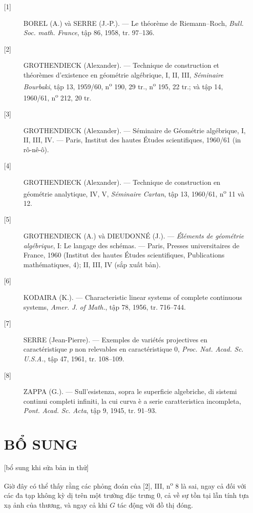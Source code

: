 \begin{description}
\item[{[1]}] BOREL (A.) và SERRE (J.-P.). --- Le théorème de Riemann--Roch,
\emph{Bull. Soc. math. France}, tập 86, 1958, tr. 97--136.

\item[{[2]}] GROTHENDIECK (Alexander). --- Technique de construction et
théorèmes d'existence en géométrie algébrique, I, II, III, \emph{Séminaire
Bourbaki}, tập 13, 1959/60, n\textsuperscript{o} 190, 29 tr.,
n\textsuperscript{o} 195, 22 tr.; và tập 14, 1960/61,
n\textsuperscript{o} 212, 20 tr.

\item[{[3]}] GROTHENDIECK (Alexander). --- Séminaire de Géométrie algébrique,
I, II, III, IV. --- Paris, Institut des hautes Études scientifiques, 1960/61
(in rô-nê-ô).

\item[{[4]}] GROTHENDIECK (Alexander). --- Technique de construction en
géométrie analytique, IV, V, \emph{Séminaire Cartan}, tập 13, 1960/61,
n\textsuperscript{o} 11 và 12.

\item[{[5]}] GROTHENDIECK (A.) và DIEUDONNÉ (J.). --- \emph{Éléments de
géométrie algébrique}, I: Le langage des schémas. --- Paris, Presses
universitaires de France, 1960 (Institut des hautes Études scientifiques,
Publications mathématiques, 4); II, III, IV (sắp xuất bản).

\item[{[6]}] KODAIRA (K.). --- Characteristic linear systems of complete
continuous systems, \emph{Amer. J. of Math.}, tập 78, 1956, tr. 716--744.

\item[{[7]}] SERRE (Jean-Pierre). --- Exemples de variétés projectives en
caractéristique $p$ non relevables en caractéristique 0, \emph{Proc. Nat. Acad.
Sc. U.S.A.}, tập 47, 1961, tr. 108--109.

\item[{[8]}] ZAPPA (G.). --- Sull'esistenza, sopra le superficie algebriche, di
sistemi continui completi infiniti, la cui curva è a serie caratteristica
incompleta, \emph{Pont. Acad. Sc. Acta}, tập 9, 1945, tr. 91--93.
\end{description}

\section*{BỔ SUNG}
\begin{center}
{\small [bổ sung khi sửa bản in thử]}
\end{center}

Giờ đây có thể thấy rằng các phỏng đoán của [2], III,
n\textsuperscript{o} 8 là sai, ngay cả đối với các đa tạp không kỳ dị trên một
trường đặc trưng 0, cả về sự tồn tại lẫn tính tựa xạ ảnh của thương, và ngay cả
khi $G$ tác động với đồ thị đóng.

\par
